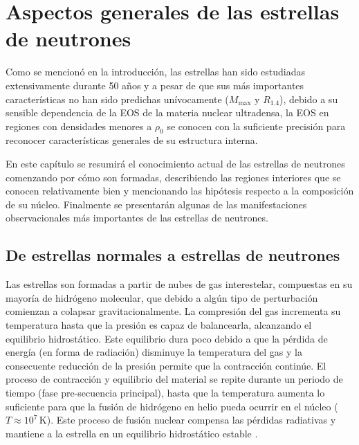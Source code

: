 \chapter{Aspectos generales de las estrellas de neutrones}

Como se mencionó en la introducción, las estrellas han sido estudiadas extensivamente durante 50 años y a pesar de que sus más importantes características no han sido predichas unívocamente ($M_{\text{max}}$ y $R_{1.4}$), debido a su sensible dependencia de la EOS de la materia nuclear ultradensa,%
la EOS en regiones con densidades menores a $\rho_0$ se conocen con la suficiente precisión \cite{Haensel2007,Chamel2008} para reconocer características generales de su estructura interna. 

En este capítulo se resumirá el conocimiento actual de las estrellas de neutrones comenzando por cómo son formadas, describiendo las regiones interiores que se conocen relativamente bien y mencionando las hipótesis respecto a la composición de su núcleo. Finalmente se presentarán algunas de las manifestaciones observacionales más importantes de las estrellas de neutrones.


\section{De estrellas normales a estrellas de neutrones}

Las estrellas son formadas a partir de nubes de gas interestelar, compuestas en su mayoría de hidrógeno molecular, que debido a algún tipo de perturbación comienzan a colapsar gravitacionalmente. La compresión del gas incrementa su temperatura hasta que la presión es capaz de balancearla, alcanzando el equilibrio hidrostático. Este equilibrio dura poco debido a que la pérdida de energía (en forma de radiación) disminuye la temperatura del gas y la consecuente reducción de la presión permite que la contracción continúe. El proceso de contracción y equilibrio del material se repite durante un periodo de tiempo (fase pre-secuencia principal), hasta que la temperatura aumenta lo suficiente para que la fusión de hidrógeno en helio pueda ocurrir en el núcleo ($T\approx 10^7\,\si{\kelvin}$). Este proceso de fusión nuclear compensa las pérdidas radiativas y mantiene a la estrella en un equilibrio hidrostático estable \cite{Scilla2016}.

